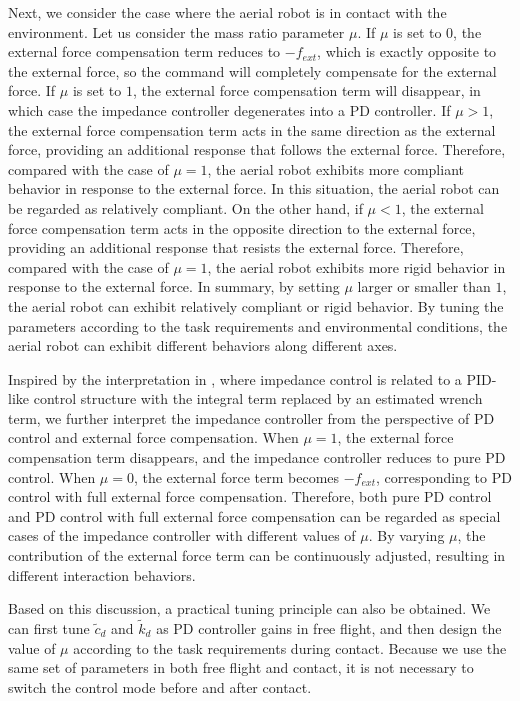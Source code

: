 Next, we consider the case where the aerial robot is in contact with the environment. Let us consider the mass ratio parameter $\mu$. If $\mu$ is set to $0$, the external force compensation term reduces to $-{{f}_{ext}}$, which is exactly opposite to the external force, so the command will completely compensate for the external force. If $\mu$ is set to $1$, the external force compensation term will disappear, in which case the impedance controller degenerates into a PD controller. If $\mu > 1$, the external force compensation term acts in the same direction as the external force, providing an additional response that follows the external force. Therefore, compared with the case of $\mu=1$, the aerial robot exhibits more compliant behavior in response to the external force. In this situation, the aerial robot can be regarded as relatively compliant. On the other hand, if $\mu < 1$, the external force compensation term acts in the opposite direction to the external force, providing an additional response that resists the external force. Therefore, compared with the case of $\mu=1$, the aerial robot exhibits more rigid behavior in response to the external force. In summary, by setting $\mu$ larger or smaller than $1$, the aerial robot can exhibit relatively compliant or rigid behavior. By tuning the parameters according to the task requirements and environmental conditions, the aerial robot can exhibit different behaviors along different axes.

Inspired by the interpretation in \cite{bodie_2023_omnidirectional}, where impedance control is related to a PID-like control structure with the integral term replaced by an estimated wrench term, we further interpret the impedance controller from the perspective of PD control and external force compensation. When $\mu=1$, the external force compensation term disappears, and the impedance controller reduces to pure PD control. When $\mu=0$, the external force term becomes $-f_{ext}$, corresponding to PD control with full external force compensation. Therefore, both pure PD control and PD control with full external force compensation can be regarded as special cases of the impedance controller with different values of $\mu$. By varying $\mu$, the contribution of the external force term can be continuously adjusted, resulting in different interaction behaviors.

 
Based on this discussion, a practical tuning principle can also be obtained. We can first tune $\tilde{c}_d$ and $\tilde{k}_d$ as PD controller gains in free flight, and then design the value of $\mu$ according to the task requirements during contact. Because we use the same set of parameters in both free flight and contact, it is not necessary to switch the control mode before and after contact.

